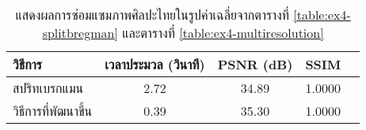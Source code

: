 \begin{table}[H]
    \centering
    \begin{tabular}[ht]{|l|c|c|c|c|}
        \hline
        วิธีการ  & เวลาประมวล  (วินาที) & PSNR (dB) & SSIM \\
        \hline
        สปริทเบรกแมน & 2.72 & 34.89 & 1.0000 \\ 
        วิธีการที่พัฒนาขึ้น & 0.39 & 35.30 & 1.0000 \\
        \hline
    \end{tabular}
    \caption{แสดงผลการซ่อมแซมภาพศิลปะไทยในรูปค่าเฉลี่ยจากตารางที่ 		\ref{table:ex4-splitbregman} และตารางที่ 		\ref{table:ex4-multiresolution} }
    \label{table:ex4-summary}
\end{table}	